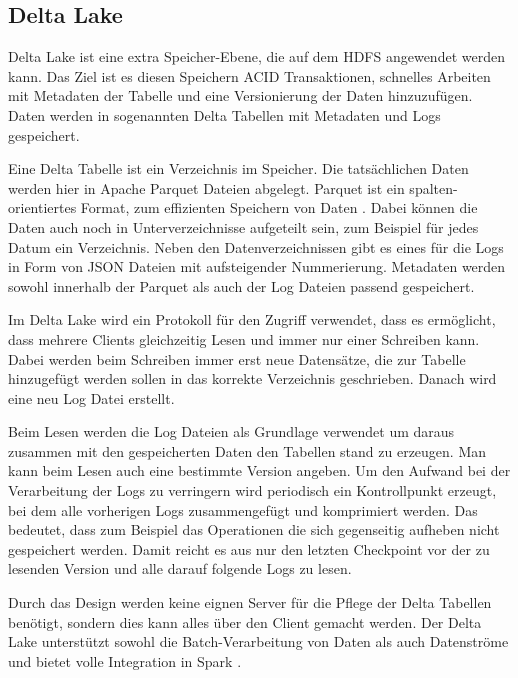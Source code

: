 \subsection{Delta Lake}

Delta Lake ist eine extra Speicher-Ebene, die auf dem HDFS angewendet werden kann.
Das Ziel ist es diesen Speichern ACID Transaktionen, schnelles Arbeiten mit Metadaten der Tabelle und eine Versionierung der Daten hinzuzufügen.
Daten werden in sogenannten Delta Tabellen mit Metadaten und Logs gespeichert.

Eine Delta Tabelle ist ein Verzeichnis im Speicher.
Die tatsächlichen Daten werden hier in Apache Parquet Dateien abgelegt.
Parquet ist ein spalten-orientiertes Format, zum effizienten Speichern von Daten \parencite{parquet}.
Dabei können die Daten auch noch in Unterverzeichnisse aufgeteilt sein, zum Beispiel für jedes Datum ein Verzeichnis.
Neben den Datenverzeichnissen gibt es eines für die Logs in Form von JSON Dateien mit aufsteigender Nummerierung.
Metadaten werden sowohl innerhalb der Parquet als auch der Log Dateien passend gespeichert.

Im Delta Lake wird ein Protokoll für den Zugriff verwendet, dass es ermöglicht, dass mehrere Clients gleichzeitig Lesen und immer nur einer Schreiben kann.
Dabei werden beim Schreiben immer erst neue Datensätze, die zur Tabelle hinzugefügt werden sollen in das korrekte Verzeichnis geschrieben.
Danach wird eine neu Log Datei erstellt.

Beim Lesen werden die Log Dateien als Grundlage verwendet um daraus zusammen mit den gespeicherten Daten den Tabellen stand zu erzeugen.
Man kann beim Lesen auch eine bestimmte Version angeben.
Um den Aufwand bei der Verarbeitung der Logs zu verringern wird periodisch ein Kontrollpunkt erzeugt, bei dem alle vorherigen Logs zusammengefügt und komprimiert werden.
Das bedeutet, dass zum Beispiel das Operationen die sich gegenseitig aufheben nicht gespeichert werden.
Damit reicht es aus nur den letzten Checkpoint vor der zu lesenden Version und alle darauf folgende Logs zu lesen.

Durch das Design werden keine eignen Server für die Pflege der Delta Tabellen benötigt, sondern dies kann alles über den Client gemacht werden.
Der Delta Lake unterstützt sowohl die Batch-Verarbeitung von Daten als auch Datenströme und bietet volle Integration in Spark \parencite{deltalake}.

